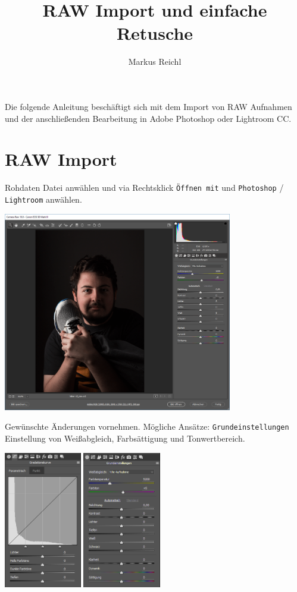 \documentclass[notoc, landscape]{school}
\title{RAW Import und einfache Retusche}
\author{Markus Reichl}
\begin{document}
\thispagestyle{fancy}

Die folgende Anleitung beschäftigt sich mit dem Import von RAW\cite{wiki-raw} Aufnahmen und der anschließenden Bearbeitung in Adobe Photoshop oder Lightroom CC.

\section{RAW Import}
\begin{multicols}{2}
\begin{outline}[enumerate]
\1 Rohdaten Datei anwählen und via Rechtsklick \texttt{Öffnen mit} und \texttt{Photoshop} / \texttt{Lightroom} anwählen.

\includegraphics[width=10cm]{raw-01.png}

\columnbreak

\1 Gewünschte Änderungen vornehmen. Mögliche Ansätze:
	\2 \texttt{Grundeinstellungen} Einstellung von Weißabgleich, Farbsättigung und Tonwertbereich.

\includegraphics[height=6cm]{raw-03-grad.png}
\includegraphics[height=6cm]{raw-02-grund.png}


\end{outline}
\end{multicols}
\end{document}
